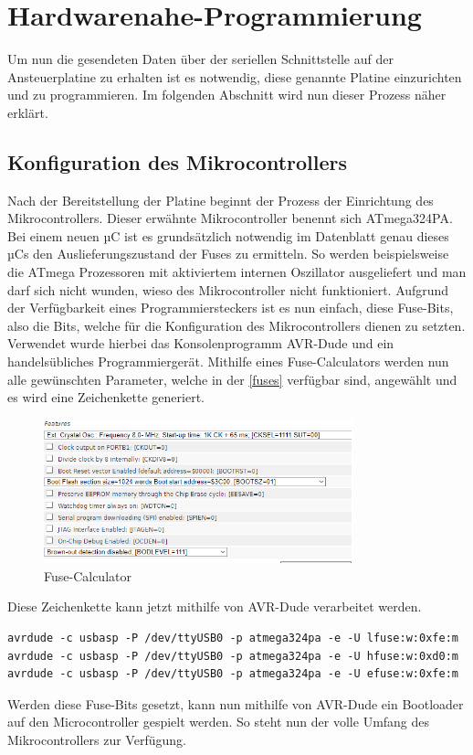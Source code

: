 \section{Hardwarenahe-Programmierung}
Um nun die gesendeten Daten über der seriellen Schnittstelle auf der Ansteuerplatine zu erhalten ist es notwendig, diese genannte Platine einzurichten und zu programmieren.
Im folgenden Abschnitt wird nun dieser Prozess näher erklärt.
\subsection{Konfiguration des Mikrocontrollers}
Nach der Bereitstellung der Platine beginnt der Prozess der Einrichtung des Mikrocontrollers.
Dieser erwähnte Mikrocontroller benennt sich ATmega324PA.
Bei einem neuen µC ist es grundsätzlich notwendig im Datenblatt genau dieses µCs den Auslieferungszustand der Fuses zu ermitteln.
So werden beispielsweise die ATmega Prozessoren mit aktiviertem internen Oszillator ausgeliefert und man darf sich nicht wunden, wieso des Mikrocontroller nicht funktioniert.
Aufgrund der Verfügbarkeit eines Programmiersteckers ist es nun einfach, diese Fuse-Bits, also die Bits, welche für die Konfiguration des Mikrocontrollers dienen zu setzten.
Verwendet wurde hierbei das Konsolenprogramm AVR-Dude und ein handelsübliches Programmiergerät.
Mithilfe eines Fuse-Calculators werden nun alle gewünschten Parameter, welche in der \autoref{fuses} verfügbar sind, angewählt und es wird eine Zeichenkette generiert.
\begin{figure}[H]
\centering
\includegraphics[width=0.8\textwidth]{fig/ainf/Features.PNG}
\caption{Fuse-Calculator}
\label{fuses}
\end{figure}
Diese Zeichenkette kann jetzt mithilfe von AVR-Dude verarbeitet werden.
\begin{lstlisting}[style=java,caption=Java-Codebeispiel,label=resource]
avrdude -c usbasp -P /dev/ttyUSB0 -p atmega324pa -e -U lfuse:w:0xfe:m
avrdude -c usbasp -P /dev/ttyUSB0 -p atmega324pa -e -U hfuse:w:0xd0:m
avrdude -c usbasp -P /dev/ttyUSB0 -p atmega324pa -e -U efuse:w:0xfe:m
\end{lstlisting}
Werden diese Fuse-Bits gesetzt, kann nun mithilfe von AVR-Dude ein Bootloader auf den Microcontroller gespielt werden.
So steht nun der volle Umfang des Mikrocontrollers zur Verfügung.
